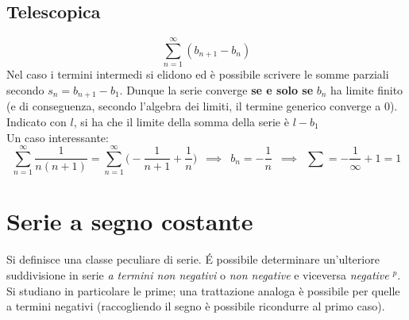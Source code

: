 \documentclass[10pt, oneside]{book}
\theoremstyle{plain}
\begin{document}
\subsection{Telescopica}
\[\sum \limits_{n=1}^{\infty} (b_{n+1} - b_n)\]
Nel caso i termini intermedi si elidono ed è possibile scrivere le somme parziali secondo $s_n = b_{n+1} - b_1$. Dunque la serie converge \textbf{se e solo se} $b_n$ ha limite finito (e di conseguenza, secondo l'algebra dei limiti, il termine generico converge a $0$). Indicato con $l$, si ha che il limite della somma della serie è $l - b_1$
\\Un caso interessante:
\[\sum \limits_{n=1}^{\infty} \frac{1}{n (n+1)} = \sum \limits_{n=1}^{\infty} \bigg(-\frac{1}{n+1} + \frac{1}{n}\bigg) \enspace \implies \enspace b_n = - \frac{1}{n} \enspace \implies \enspace \sum = - \frac{1}{\infty} + 1 = 1\]

\section{Serie a segno costante}
Si definisce una classe peculiare di serie. \'E possibile determinare un'ulteriore suddivisione in serie \textit{a termini non negativi} o \textit{non negative} e viceversa \textit{negative} \hypertarget{posit}{$^p$}. Si studiano in particolare le prime; una trattazione analoga è possibile per quelle a termini negativi (raccogliendo il segno è possibile ricondurre al primo caso).
\end{document}
